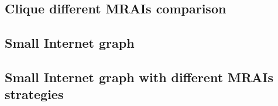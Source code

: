 \documentclass[10pt,journal,onecolumn]{IEEEtran}
\begin{document}
\subsection{Clique different MRAIs comparison}
\label{subsec:clique_different_mrais}

\subsection{Small Internet graph}
\label{subsec:small_internet_graph}

\subsection{Small Internet graph with different MRAIs strategies}
\label{subsec:small_internet_graph_multiple_MRAIs}

\printindex


\end{document}
